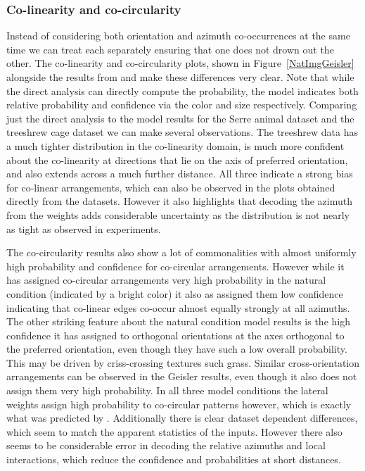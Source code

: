 \subsubsection{Co-linearity and co-circularity}

Instead of considering both orientation and azimuth co-occurrences at
the same time we can treat each separately ensuring that one does not
drown out the other. The co-linearity and co-circularity plots, shown
in Figure~\ref{NatImgGeisler} alongside the results from
\cite{Geisler2001} and \cite{Perrinet2015} make these differences very
clear. Note that while the direct analysis can directly compute the
probability, the model indicates both relative probability and
confidence via the color and size respectively. Comparing just the
direct analysis to the model results for the Serre animal dataset and
the treeshrew cage dataset we can make several observations. The
treeshrew data has a much tighter distribution in the co-linearity
domain, is much more confident about the co-linearity at directions
that lie on the axis of preferred orientation, and also extends across
a much further distance. All three indicate a strong bias for
co-linear arrangements, which can also be observed in the plots
obtained directly from the datasets. However it also highlights that
decoding the azimuth from the weights adds considerable uncertainty as
the distribution is not nearly as tight as observed in experiments.

The co-circularity results also show a lot of commonalities with
almost uniformly high probability and confidence for co-circular
arrangements. However while it has assigned co-circular arrangements
very high probability in the natural condition (indicated by a bright
color) it also as assigned them low confidence indicating that
co-linear edges co-occur almost equally strongly at all azimuths. The
other striking feature about the natural condition model results is
the high confidence it has assigned to orthogonal orientations at the
axes orthogonal to the preferred orientation, even though they have
such a low overall probability. This may be driven by criss-crossing
textures such grass. Similar cross-orientation arrangements can be
observed in the Geisler results, even though it also does not assign
them very high probability. In all three model conditions the lateral
weights assign high probability to co-circular patterns however, which
is exactly what was predicted by \citep{Geisler2001}. Additionally
there is clear dataset dependent differences, which seem to match the
apparent statistics of the inputs. However there also seems to be
considerable error in decoding the relative azimuths and local
interactions, which reduce the confidence and probabilities at short
distances.

